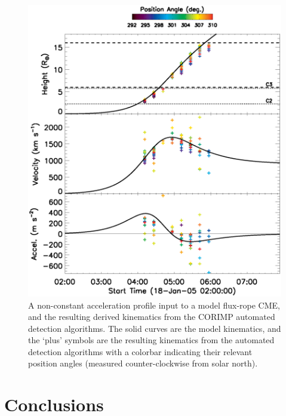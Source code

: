 \documentclass[preprint2]{aastex}
\begin{document}
\begin{figure}[!t]
\centerline{\includegraphics[scale=0.39]{images/figure_peak_accel.eps}}
\caption{A non-constant acceleration profile input to a model flux-rope CME, and the resulting derived kinematics from the CORIMP automated detection algorithms. The solid curves are the model kinematics, and the `plus' symbols are the resulting kinematics from the automated detection algorithms with a colorbar indicating their relevant position angles (measured counter-clockwise from solar north).}
\label{figure_peak_accel}
\end{figure}

\section{Conclusions}
\label{sect_conclusions}
\end{document}
